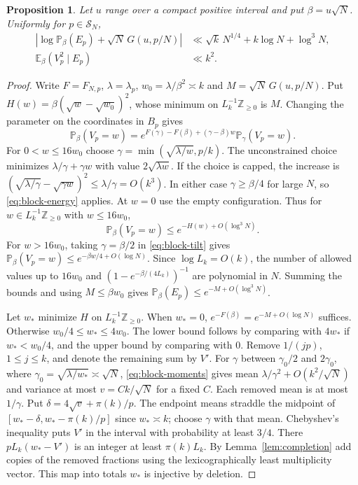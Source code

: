 \documentclass[11pt]{amsart}
\newtheorem{proposition}[theorem]{Proposition}
\theoremstyle{remark}
\newcommand{\Pp}{\mathbb P}
\newcommand{\Ee}{\mathbb E}
\newcommand{\Z}{\mathbb Z}
\begin{document}
\begin{proposition}\label{prop:block}
Let \(u\) range over a compact positive interval and put \(\beta=u\sqrt N\).
Uniformly for \(p\in\mathcal S_N\),
\begin{align}
 |\log \Pp_\beta(E_p)+\sqrt N\,G(u,p/N)|
   &\ll \sqrt{k}\,N^{1/4}+k\log N+\log^3 N,\label{eq:local}\\
 \Ee_\beta(V_p^2\mid E_p)&\ll k^2.\label{eq:block-second}
\end{align}
\end{proposition}

\begin{proof}
Write \(F=F_{N,p}\), \(\lambda=\lambda_p\), \(w_0=\lambda/\beta^2\asymp k\)
and \(M=\sqrt N\,G(u,p/N)\). Put \(H(w)=\beta(\sqrt w-\sqrt{w_0})^2\),
whose minimum on \(L_k^{-1}\Z_{\ge0}\) is \(M\).
Changing the parameter on the coordinates in \(B_p\) gives
\begin{equation}\label{eq:block-tilt}
 \Pp_\beta(V_p=w)=
 e^{F(\gamma)-F(\beta)+(\gamma-\beta)w}\Pp_\gamma(V_p=w).
\end{equation}
For \(0<w\le16w_0\) choose \(\gamma=\min(\sqrt{\lambda/w},p/k)\).
The unconstrained choice minimizes \(\lambda/\gamma+\gamma w\)
with value \(2\sqrt{\lambda w}\). If the choice is capped, the increase
is \((\sqrt{\lambda/\gamma}-\sqrt{\gamma w})^2\le\lambda/\gamma=O(k^3)\).
In either case \(\gamma\ge\beta/4\) for large \(N\), so
\eqref{eq:block-energy} applies. At \(w=0\) use the empty configuration.
Thus for \(w\in L_k^{-1}\Z_{\ge0}\) with \(w\le16w_0\),
\begin{equation}\label{eq:bounded-block-upper}
 \Pp_\beta(V_p=w)\le e^{-H(w)+O(\log^3 N)}.
\end{equation}
For \(w>16w_0\), taking \(\gamma=\beta/2\) in \eqref{eq:block-tilt}
gives \(\Pp_\beta(V_p=w)\le e^{-\beta w/4+O(\log N)}\).
Since \(\log L_k=O(k)\), the number of allowed values up to \(16w_0\)
and \((1-e^{-\beta/(4L_k)})^{-1}\) are polynomial in \(N\).
Summing the bounds and using \(M\le\beta w_0\) gives
\(\Pp_\beta(E_p)\le e^{-M+O(\log^3 N)}\).

Let \(w_*\) minimize \(H\) on \(L_k^{-1}\Z_{\ge0}\). When \(w_*=0\),
\(e^{-F(\beta)}=e^{-M+O(\log N)}\) suffices.
Otherwise \(w_0/4\le w_*\le4w_0\). The lower bound follows by comparing
with \(4w_*\) if \(w_*<w_0/4\), and the upper bound by comparing with \(0\).
Remove \(1/(jp)\), \(1\le j\le k\), and denote the remaining sum by \(V'\).
For \(\gamma\) between \(\gamma_0/2\) and \(2\gamma_0\), where
\(\gamma_0=\sqrt{\lambda/w_*}\asymp\sqrt N\), \eqref{eq:block-moments}
gives mean \(\lambda/\gamma^2+O(k^2/\sqrt N)\) and variance at most
\(v=Ck/\sqrt N\) for a fixed \(C\). Each removed mean is at most \(1/\gamma\).
Put \(\delta=4\sqrt v+\pi(k)/p\). The endpoint means straddle the
midpoint of \([w_*-\delta,w_*-\pi(k)/p]\) since \(w_*\asymp k\);
choose \(\gamma\) with that mean. Chebyshev's inequality puts \(V'\)
in the interval with probability at least \(3/4\).
There \(pL_k(w_*-V')\) is an integer at least \(\pi(k)L_k\).
By Lemma~\ref{lem:completion} add copies of the removed fractions
using the lexicographically least multiplicity vector. This map
into totals \(w_*\) is injective by deletion.


\end{proof}
\end{document}
